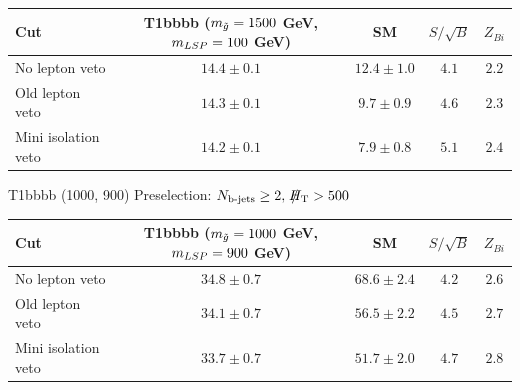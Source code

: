 \documentclass{beamer}
\begin{document}
\begin{frame}
\begin{center}
 \begin{tabular}{lcccc}
    \hline
    \hline
    Cut & T1bbbb ($m_{\tilde{g}}=1500$ GeV, $m_{LSP}=100$ GeV) & SM &  $S/\sqrt{B}$ & $Z_{Bi}$ \\ \hline
No lepton veto & $14.4 \pm 0.1$ & $12.4 \pm 1.0$ &  $4.1$ & $2.2$  \\\hline
Old lepton veto & $14.3 \pm 0.1$ & $9.7 \pm 0.9$ &  $4.6$ & $2.3$  \\
Mini isolation veto & $14.2 \pm 0.1$ & $7.9 \pm 0.8$ &  $5.1$ & $2.4$  \\
    \hline
    \hline
  \end{tabular}
 \end{center}
  \begin{center}
 \Tiny T1bbbb (1000, 900) Preselection: $N_{\text{b-jets}}\geq2,\;\slash\mkern-12mu{H}_{\text{T}}>500$


  \begin{tabular}{lcccc}
    \hline
    \hline
    Cut & T1bbbb ($m_{\tilde{g}}=1000$ GeV, $m_{LSP}=900$ GeV) & SM & $S/\sqrt{B}$ & $Z_{Bi}$ \\ \hline
No lepton veto & $34.8 \pm 0.7$ & $68.6 \pm 2.4$ &  $4.2$ & $2.6$  \\\hline
Old lepton veto & $34.1 \pm 0.7$ & $56.5 \pm 2.2$ &  $4.5$ & $2.7$  \\
Mini isolation veto & $33.7 \pm 0.7$ & $51.7 \pm 2.0$ &  $4.7$ & $2.8$  \\
    \hline
    \hline
  \end{tabular}
  \end{center}
  
\end{frame}
\end{document}
